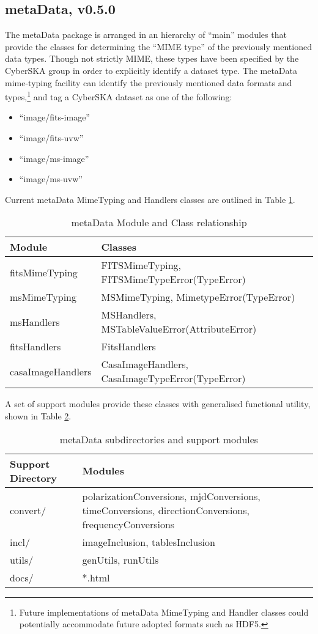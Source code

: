 \subsection{metaData, v0.5.0}
The metaData package \citep{and_2011} is arranged in an hierarchy of ``main'' modules
that provide the classes for determining the ``MIME type'' of the
previously mentioned data types. Though not strictly MIME, these types
have been specified by the CyberSKA group in order to explicitly
identify a dataset type. The metaData mime-typing facility can
identify the previously mentioned data formats and
types,\footnote{Future implementations of metaData MimeTyping and
  Handler classes could potentially accommodate future adopted formats
  such as HDF5.} and tag a CyberSKA dataset as one of the following:
\begin{itemize}
\item ``image/fits-image''
\item ``image/fits-uvw''
\item ``image/ms-image''
\item ``image/ms-uvw''
\end{itemize}
Current metaData MimeTyping and Handlers classes are outlined in Table \ref{tab:mods}.
\begin{table}[htbp]
  \centering
  \begin{tabular}{|l|p{9.0cm}|} 
    \hline
    \sc \textbf{Module} & \textbf{Classes} \\
    \hline
    fitsMimeTyping & FITSMimeTyping, FITSMimeTypeError(TypeError) \\
    msMimeTyping   & MSMimeTyping,   MimetypeError(TypeError) \\
    msHandlers     & MSHandlers,     MSTableValueError(AttributeError) \\
    fitsHandlers   & FitsHandlers \\
    casaImageHandlers  & CasaImageHandlers, CasaImageTypeError(TypeError)\\
    \hline
  \end{tabular}
  \caption{metaData Module and Class relationship}
  \label{tab:mods}
\end{table}

A set of support modules provide these classes with generalised
functional utility, shown in Table \ref{tab:subdirs}.
\begin{table}[htbp]
  \centering
  \begin{tabular}{|l|p{9.0cm}|} 
    \hline
    \sc \textbf{Support Directory} & \textbf{Modules} \\
    \hline
    convert/ & polarizationConversions, mjdConversions, timeConversions,
               directionConversions, frequencyConversions \\
    incl/   &  imageInclusion, tablesInclusion \\
    utils/  &  genUtils, runUtils \\
    \hline
    docs/   &  *.html\\
    \hline
  \end{tabular}
  \caption{metaData subdirectories and support modules}
  \label{tab:subdirs}
\end{table}

